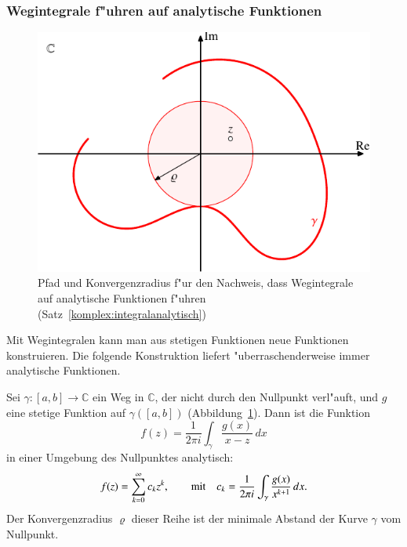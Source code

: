\subsubsection{Wegintegrale f"uhren auf analytische Funktionen}
\begin{figure}
\centering
\includegraphics{chapters/images/komplex-4.pdf}
\caption{Pfad und Konvergenzradius f"ur den Nachweis, dass Wegintegrale
auf analytische Funktionen f"uhren (Satz~\ref{komplex:integralanalytisch})
\label{komplex:integralanalytischpfad}}
\end{figure}
Mit Wegintegralen kann man aus stetigen Funktionen neue Funktionen
konstruieren.
Die folgende Konstruktion liefert "uberraschenderweise immer
analytische Funktionen.
\begin{satz}
\label{komplex:integralanalytisch}
Sei $\gamma\colon [a,b]\to\mathbb C$ ein Weg in $\mathbb C$, der nicht
durch den Nullpunkt verl"auft, und $g$ eine stetige Funktion
auf $\gamma([a,b])$ (Abbildung~\ref{komplex:integralanalytischpfad}).
Dann ist die Funktion
\[
f(z) = \frac1{2\pi i}\int_\gamma \frac{g(x)}{x-z}\,dx
\]
in einer Umgebung des Nullpunktes analytisch:
\[
f(z) = \sum_{k=0}^\infty c_k z^k,\qquad
\text{mit\quad}
c_k=\frac1{2\pi i}\int_\gamma \frac{g(x)}{x^{k+1}}\,dx.
\]
Der Konvergenzradius $\varrho$ dieser Reihe ist der minimale Abstand der
Kurve $\gamma$ vom Nullpunkt.
\end{satz}

